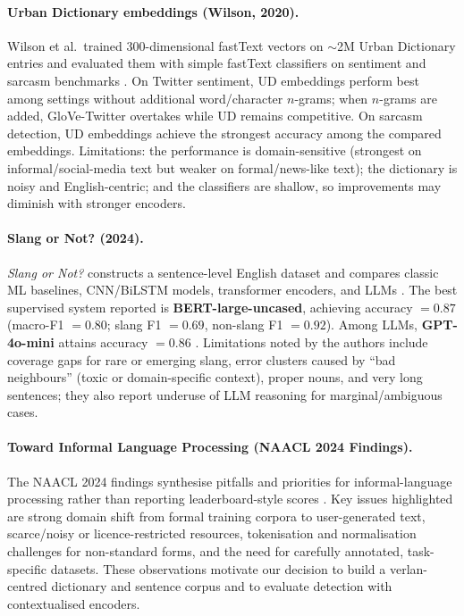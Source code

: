 \documentclass[12pt]{article}
\begin{document}
\paragraph{Urban Dictionary embeddings (Wilson, 2020).}
Wilson et al.\ trained $300$-dimensional fastText vectors on $\sim$2M Urban Dictionary entries and evaluated them with simple fastText classifiers on sentiment and sarcasm benchmarks \cite{urban2020embeddings}. On Twitter sentiment, UD embeddings perform best among settings without additional word/character $n$-grams; when $n$-grams are added, GloVe-Twitter overtakes while UD remains competitive. On sarcasm detection, UD embeddings achieve the strongest accuracy among the compared embeddings. Limitations: the performance is domain-sensitive (strongest on informal/social-media text but weaker on formal/news-like text); the dictionary is noisy and English-centric; and the classifiers are shallow, so improvements may diminish with stronger encoders. \cite{urban2020embeddings}

\paragraph{Slang or Not? (2024).}
\textit{Slang or Not?} constructs a sentence-level English dataset and compares classic ML baselines, CNN/BiLSTM models, transformer encoders, and LLMs \cite{slangornot2024}. The best supervised system reported is \textbf{BERT-large-uncased}, achieving accuracy $=0.87$ (macro-F1 $=0.80$; slang F1 $=0.69$, non-slang F1 $=0.92$). Among LLMs, \textbf{GPT-4o-mini} attains accuracy $=0.86$ \cite{slangornot2024}. Limitations noted by the authors include coverage gaps for rare or emerging slang, error clusters caused by ``bad neighbours'' (toxic or domain-specific context), proper nouns, and very long sentences; they also report underuse of LLM reasoning for marginal/ambiguous cases. \cite{slangornot2024}

\paragraph{Toward Informal Language Processing (NAACL 2024 Findings).}
The NAACL 2024 findings synthesise pitfalls and priorities for informal-language processing rather than reporting leaderboard-style scores \cite{sun2024informal}. Key issues highlighted are strong domain shift from formal training corpora to user-generated text, scarce/noisy or licence-restricted resources, tokenisation and normalisation challenges for non-standard forms, and the need for carefully annotated, task-specific datasets. These observations motivate our decision to build a verlan-centred dictionary and sentence corpus and to evaluate detection with contextualised encoders. \cite{sun2024informal}
\end{document}
